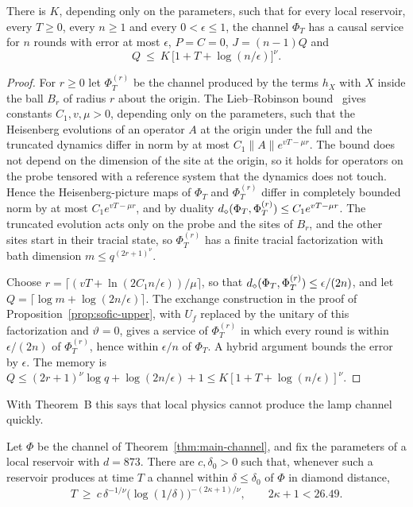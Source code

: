 \begin{proposition}\label{prop:light-cone}
There is $K$, depending only on the parameters, such that for every local reservoir, every $T\ge0$, every $n\ge1$ and every $0<\epsilon\le1$, the
channel $\Phi_T$ has a causal service for $n$ rounds with error at most $\epsilon$, $P=C=0$, $J=(n-1)Q$ and
\[
Q\ \le\ K\,\bigl[1+T+\log(n/\epsilon)\bigr]^\nu .
\]
\end{proposition}

\begin{proof}
For $r\ge0$ let $\Phi_T^{(r)}$ be the channel produced by the terms $h_X$ with $X$ inside the ball $B_r$ of radius $r$ about the origin. The
Lieb--Robinson bound~\cite{LiebRobinson1972,BHV2006,NSY2019} gives constants $C_1,v,\mu>0$, depending only on the parameters, such that the Heisenberg
evolutions of an operator $A$ at the origin under the full and the truncated dynamics differ in norm by at most $C_1\|A\|e^{vT-\mu r}$. The bound
does not depend on the dimension of the site at the origin, so it holds for operators on the probe tensored with a reference system that the
dynamics does not touch. Hence the Heisenberg-picture maps of $\Phi_T$ and $\Phi_T^{(r)}$ differ in completely bounded norm by at most
$C_1e^{vT-\mu r}$, and by duality $d_\diamond(\Phi_T,\Phi_T^{(r)})\le C_1e^{vT-\mu r}$. The truncated evolution acts only on the probe and the sites
of $B_r$, and the other sites start in their tracial state, so $\Phi_T^{(r)}$ has a finite tracial factorization with bath dimension
$m\le q^{(2r+1)^\nu}$.

Choose $r=\lceil(vT+\ln(2C_1n/\epsilon))/\mu\rceil$, so that $d_\diamond(\Phi_T,\Phi_T^{(r)})\le\epsilon/(2n)$, and let $Q=\lceil\log m+\log(2n/\epsilon)\rceil$.
The exchange construction in the proof of Proposition~\ref{prop:sofic-upper}, with $U_f$ replaced by the unitary of this factorization and
$\vartheta=0$, gives a service of $\Phi_T^{(r)}$ in which every round is within $\epsilon/(2n)$ of $\Phi_T^{(r)}$, hence within $\epsilon/n$ of
$\Phi_T$. A hybrid argument bounds the error by $\epsilon$. The memory is $Q\le(2r+1)^\nu\log q+\log(2n/\epsilon)+1\le K[1+T+\log(n/\epsilon)]^\nu$.
\end{proof}

With Theorem~B this says that local physics cannot produce the lamp channel quickly.

\begin{corollary}\label{cor:preparation}
Let $\Phi$ be the channel of Theorem~\ref{thm:main-channel}, and fix the parameters of a local reservoir with $d=873$. There are $c,\delta_0>0$ such
that, whenever such a reservoir produces at time $T$ a channel within $\delta\le\delta_0$ of $\Phi$ in diamond distance,
\[
T\ \ge\ c\,\delta^{-1/\nu}\bigl(\log(1/\delta)\bigr)^{-(2\kappa+1)/\nu},\qquad 2\kappa+1<26.49 .
\]
\end{corollary}

